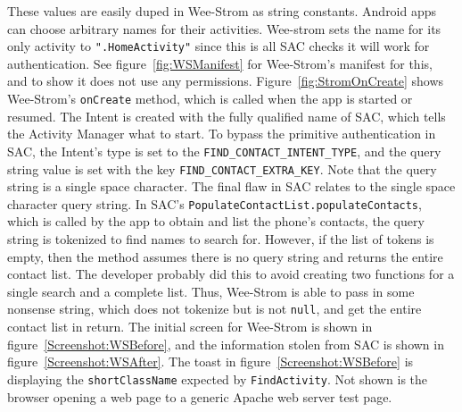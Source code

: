 \documentclass[conference,compsoc]{IEEEtran}
\begin{document}
\newline
\indent These values are easily duped in Wee-Strom as string constants. Android apps can choose arbitrary names for their activities. Wee-strom sets the name for its only activity to \texttt{".HomeActivity"} since this is all SAC checks it will work for authentication. See figure~\ref{fig:WSManifest} for Wee-Strom's manifest for this, and to show it does not use any permissions.
\newline
\indent Figure~\ref{fig:StromOnCreate} shows Wee-Strom's \texttt{onCreate} method, which is called when the app is started or resumed. The Intent is created with the fully qualified name of SAC, which tells the Activity Manager what to start. To bypass the primitive authentication in SAC, the Intent's type is set to the \texttt{FIND\_CONTACT\_INTENT\_TYPE}, and the query string value is set with the key \texttt{FIND\_CONTACT\_EXTRA\_KEY}. Note that the query string is a single space character.
\newline
\indent The final flaw in SAC relates to the single space character query string. In SAC's \texttt{PopulateContactList.populateContacts}, which is called by the app to obtain and list the phone's contacts, the query string is tokenized to find names to search for. However, if the list of tokens is empty, then the method assumes there is no query string and returns the entire contact list. The developer probably did this to avoid creating two functions for a single search and a complete list. Thus, Wee-Strom is able to pass in some nonsense string, which does not tokenize but is not \texttt{null}, and get the entire contact list in return. The initial screen for Wee-Strom is shown in figure~\ref{Screenshot:WSBefore}, and the information stolen from SAC is shown in figure~\ref{Screenshot:WSAfter}. The toast in figure~\ref{Screenshot:WSBefore} is displaying the \texttt{shortClassName} expected by \texttt{FindActivity}. Not shown is the browser opening a web page to a generic Apache web server test page.
\end{document}
